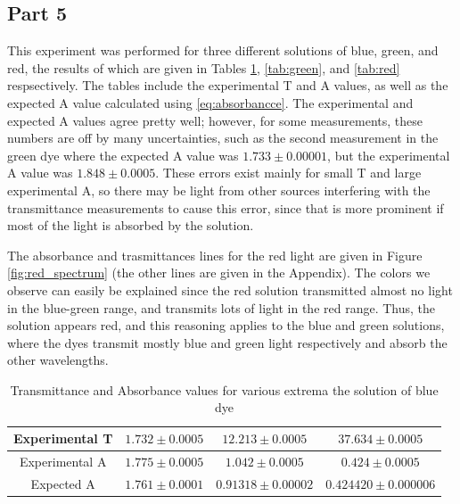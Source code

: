 \subsection{Part 5}
This experiment was performed for three different solutions of blue, green, and red, the results of which are given in Tables \ref{tab:blue}, \ref{tab:green}, and \ref{tab:red} respsectively. The tables include the experimental T and A values, as well as the expected A value calculated using \ref{eq:absorbancce}. The experimental and expected A values agree pretty well; however, for some measurements, these numbers are off by many uncertainties, such as the second measurement in the green dye where the expected A value was $1.733\pm0.00001$, but the experimental A value was $1.848 \pm 0.0005$. These errors exist mainly for small T and large experimental A, so there may be light from other sources interfering with the transmittance measurements to cause this error, since that is more prominent if most of the light is absorbed by the solution.

The absorbance and trasmittances lines for the red light are given in Figure \ref{fig:red_spectrum} (the other lines are given in the Appendix). The colors we observe can easily be explained since the red solution transmitted almost no light in the blue-green range, and transmits lots of light in the red range. Thus, the solution appears red, and this reasoning applies to the blue and green solutions, where the dyes transmit mostly blue and green light respectively and absorb the other wavelengths.


\begin{table}
    \begin{adjustbox}{width=1.1\textwidth, center}
        \begin{tabular}{|c|c|c|c|}
            \hline Experimental T & $1.732 \pm 0.0005$ & $12.213 \pm 0.0005$   & $37.634 \pm 0.0005$     \\
            \hline Experimental A & $1.775 \pm 0.0005$ & $1.042 \pm 0.0005$    & $0.424 \pm 0.0005$      \\
            \hline Expected A     & $1.761 \pm 0.0001$ & $0.91318 \pm 0.00002$ & $0.424420 \pm 0.000006$ \\
            \hline
        \end{tabular}
    \end{adjustbox}
    \caption{Transmittance and Absorbance values for various extrema the solution of blue dye}
    \label{tab:blue}
\end{table}

